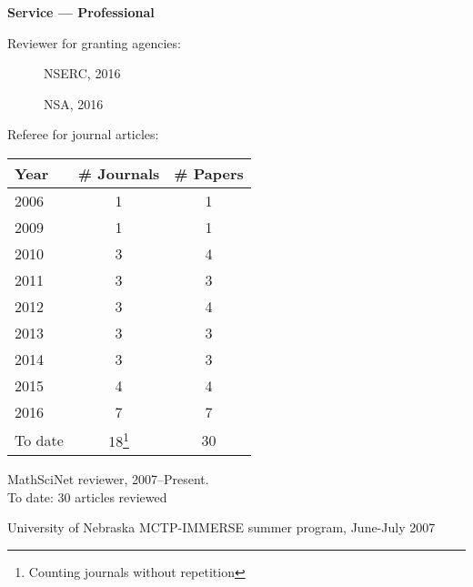 \documentclass[12pt]{article}
\begin{document}
\textbf{Service --- Professional}
\begin{description}
\setlength{}

\item[] Reviewer for granting agencies:
\begin{description}
\item[] NSERC, 2016
\item[] NSA, 2016
\end{description}

\item[] Referee for journal articles: \\

\setcounter{footnote}{0}
\begin{center}
\begin{savenotes}
\begin{tabular}{lcc}
\toprule
Year & \# Journals & \# Papers \\
\midrule
2006 & 1 & 1 \\
2009 & 1 & 1 \\
2010 & 3 & 4 \\
2011 & 3 & 3 \\
2012 & 3 & 4 \\
2013 & 3 & 3 \\
2014 & 3 & 3 \\
2015 & 4 & 4 \\
2016 & 7 & 7 \\
\midrule
To date & 18\footnote{Counting journals without repetition} & 30 \\
\bottomrule
\end{tabular}
\end{savenotes}
\end{center}

\item[] MathSciNet reviewer, 2007--Present. \\
To date: 30 articles reviewed

\item[] University of Nebraska MCTP-IMMERSE summer program, June-July 2007

\end{description}
\end{document}
